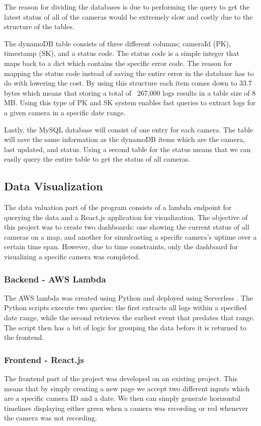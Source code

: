 \documentclass[12pt]{article}
\begin{document}
The reason for dividing the databases is due to performing the query to get the latest status of all of the cameras would be extremely slow and costly due to the structure of the tables.

The dynamoDB table consists of three different columns; cameraId (PK), timestamp (SK), and a status code. The status code is a simple integer that maps back to a dict which contains the specific error code. The reason for mapping the status code instead of saving the entire error in the database has to do with lowering the cost. By using this structure each item comes down to 33.7 bytes which means that storing a total of ~267,000 logs results in a table size of 8 MB. Using this type of PK and SK system enables fast queries to extract logs for a given camera in a specific date range.

Lastly, the MySQL database will consist of one entry for each camera. The table will save the same information as the dynamoDB items which are the camera, last updated, and status. Using a second table for the status means that we can easily query the entire table to get the status of all cameras.

\subsection{Data Visualization}
The data valuation part of the program consists of a lambda endpoint for querying the data and a React.js \cite{React40:online} application for visualization. The objective of this project was to create two dashboards: one showing the current status of all cameras on a map, and another for simulcasting a specific camera's uptime over a certain time span. However, due to time constraints, only the dashboard for visualizing a specific camera was completed.

\subsubsection{Backend - AWS Lambda}
The AWS lambda was created using Python and deployed using Serverless \cite{Serverle24:online}. The Python scripts execute two queries: the first extracts all logs within a specified date range, while the second retrieves the earliest event that predates that range. The script then has a bit of logic for grouping the data before it is returned to the frontend.

\subsubsection{Frontend - React.js}
The frontend part of the project was developed on an existing project. This means that by simply creating a new page we accept two different inputs which are a specific camera ID and a date. We then can simply generate horizontal timelines displaying either green when a camera was recording or red whenever the camera was not recording.
\end{document}
